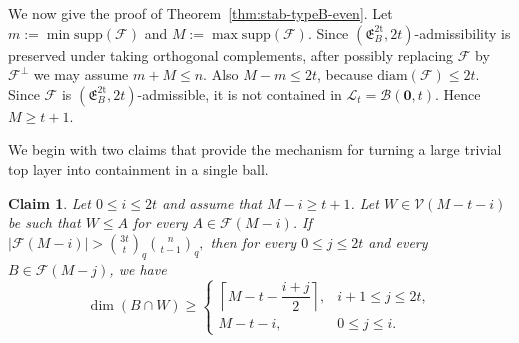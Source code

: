 \documentclass[11pt]{article}
\newtheorem{claim}[theorem]{Claim}
\theoremstyle{definition}
\newcommand{\qbinom}[2]{\genfrac{(}{)}{0pt}{}{#1}{#2}_q}
\newcommand{\diam}{\mathrm{diam}}
\newcommand{\supp}{\mathrm{supp}}
\begin{document}
We now give the proof of Theorem~\ref{thm:stab-typeB-even}. 
Let $m:=\min\supp(\mathcal F)$ and $M:=\max\supp(\mathcal F)$. 
Since $(\mathfrak E_B^{\mathrm{2t}},2t)$-admissibility is preserved under taking orthogonal complements, after possibly replacing $\mathcal F$ by $\mathcal F^\perp$ we may assume $m+M\le n$. 
Also \(M-m\le 2t\), because \(\diam(\mathcal F)\le 2t\). Since \(\mathcal F\) is \((\mathfrak E_B^{\mathrm{2t}},2t)\)-admissible, it is not contained in \(\mathcal L_t=\mathcal B(\boldsymbol0,t)\). Hence \(M\ge t+1\).

We begin with two claims that provide the mechanism for turning a large trivial top layer into containment in a single ball.

\begin{claim}\label{claim:typeB-propagation}
Let $0\le i\le 2t$ and assume that $M-i\ge t+1$. 
Let $W\in\mathcal V(M-t-i)$ be such that $W\le A$ for every $A\in\mathcal F(M-i)$. 
If
\(
|\mathcal F(M-i)|>\qbinom{3t}{t}\qbinom{n}{t-1},
\)
then for every $0\le j\le 2t$ and every $B\in\mathcal F(M-j)$, we have
\[
\dim(B\cap W)\ge
\begin{cases}
\left\lceil M-t-\dfrac{i+j}{2}\right\rceil, & i+1\le j\le 2t,\\[2mm]
M-t-i, & 0\le j\le i.
\end{cases}
\]
\end{claim}
\end{document}

